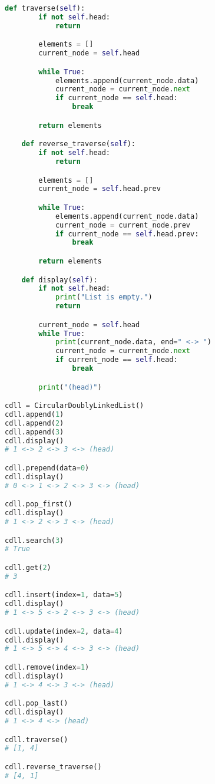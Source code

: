 \begin{lstlisting}[language=Python]
    def traverse(self):
        if not self.head:
            return

        elements = []
        current_node = self.head

        while True:
            elements.append(current_node.data)
            current_node = current_node.next
            if current_node == self.head:
                break

        return elements

    def reverse_traverse(self):
        if not self.head:
            return

        elements = []
        current_node = self.head.prev

        while True:
            elements.append(current_node.data)
            current_node = current_node.prev
            if current_node == self.head.prev:
                break

        return elements

    def display(self):
        if not self.head:
            print("List is empty.")
            return

        current_node = self.head
        while True:
            print(current_node.data, end=" <-> ")
            current_node = current_node.next
            if current_node == self.head:
                break

        print("(head)")

cdll = CircularDoublyLinkedList()
cdll.append(1)
cdll.append(2)
cdll.append(3)
cdll.display()
# 1 <-> 2 <-> 3 <-> (head)

cdll.prepend(data=0)
cdll.display()
# 0 <-> 1 <-> 2 <-> 3 <-> (head)

cdll.pop_first()
cdll.display()
# 1 <-> 2 <-> 3 <-> (head)

cdll.search(3)
# True

cdll.get(2)
# 3

cdll.insert(index=1, data=5)
cdll.display()
# 1 <-> 5 <-> 2 <-> 3 <-> (head)

cdll.update(index=2, data=4)
cdll.display()
# 1 <-> 5 <-> 4 <-> 3 <-> (head)

cdll.remove(index=1)
cdll.display()
# 1 <-> 4 <-> 3 <-> (head)

cdll.pop_last()
cdll.display()
# 1 <-> 4 <-> (head)

cdll.traverse()
# [1, 4]

cdll.reverse_traverse()
# [4, 1]
\end{lstlisting}

\newpage